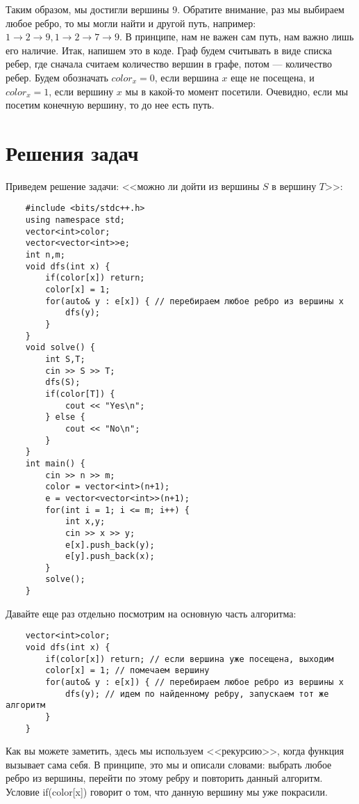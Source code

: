 \documentclass{article}
\begin{document}
Таким образом, мы достигли вершины $9$. Обратите внимание, раз мы выбираем любое ребро, то мы могли найти и другой путь, например: $1 \rightarrow 2 \rightarrow 9, 1 \rightarrow 2 \rightarrow 7 \rightarrow 9$. В принципе, нам не важен сам путь, нам важно лишь его наличие. Итак, напишем это в коде. Граф будем считывать в виде списка ребер, где сначала считаем количество вершин в графе, потом --- количество ребер. Будем обозначать $color_x = 0$, если вершина $x$ еще не посещена, и $color_x = 1$, если вершину $x$ мы в какой-то момент посетили. Очевидно, если мы посетим конечную вершину, то до нее есть путь. 

\section{Решения задач}

Приведем решение задачи: <<можно ли дойти из вершины $S$ в вершину $T$>>:

\begin{verbatim}
    #include <bits/stdc++.h>
    using namespace std;
    vector<int>color; 
    vector<vector<int>>e;
    int n,m;
    void dfs(int x) {
        if(color[x]) return;
        color[x] = 1;
        for(auto& y : e[x]) { // перебираем любое ребро из вершины x
            dfs(y);
        }
    }
    void solve() {
        int S,T;
        cin >> S >> T;
        dfs(S);
        if(color[T]) {
            cout << "Yes\n";
        } else {
            cout << "No\n";
        }
    }
    int main() {
        cin >> n >> m;
        color = vector<int>(n+1);
        e = vector<vector<int>>(n+1);
        for(int i = 1; i <= m; i++) {
            int x,y;
            cin >> x >> y;
            e[x].push_back(y);
            e[y].push_back(x);
        }
        solve();
    }
\end{verbatim}

Давайте еще раз отдельно посмотрим на основную часть алгоритма:

\begin{verbatim}
    vector<int>color; 
    void dfs(int x) { 
        if(color[x]) return; // если вершина уже посещена, выходим
        color[x] = 1; // помечаем вершину
        for(auto& y : e[x]) { // перебираем любое ребро из вершины x
            dfs(y); // идем по найденному ребру, запускаем тот же алгоритм
        }
    }
\end{verbatim}
Как вы можете заметить, здесь мы используем <<рекурсию>>, когда функция вызывает сама себя. В принципе, это мы и описали словами: выбрать любое ребро из вершины, перейти по этому ребру и повторить данный алгоритм. Условие if(color[x]) говорит о том, что данную вершину мы уже покрасили.
\end{document}
